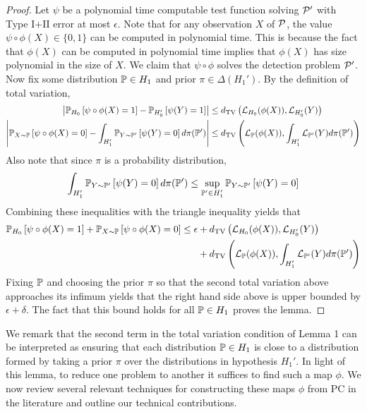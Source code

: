 \documentclass[11pt]{article}
\begin{document}
\begin{proof}
Let $\psi$ be a polynomial time computable test function solving $\mathcal{P}'$ with Type I$+$II error at most $\epsilon$. Note that for any observation $X$ of $\mathcal{P}$, the value $\psi \circ \phi(X) \in \{0, 1\}$ can be computed in polynomial time. This is because the fact that $\phi(X)$ can be computed in polynomial time implies that $\phi(X)$ has size polynomial in the size of $X$. We claim that $\psi \circ \phi$ solves the detection problem $\mathcal{P}'$. Now fix some distribution $\mathbb{P} \in H_1$ and prior $\pi \in \Delta(H_1')$. By the definition of total variation,
\begin{align*}
\left| \mathbb{P}_{H_0} \left[ \psi \circ \phi(X) = 1 \right] - \mathbb{P}_{H_0'} \left[ \psi(Y) = 1 \right] \right| &\le d_{\text{TV}}\left(\mathcal{L}_{H_0}(\phi(X)), \mathcal{L}_{H_0'}(Y)\right) \\
\left| \mathbb{P}_{X \sim \mathbb{P}} \left[ \psi \circ \phi(X) = 0 \right] - \int_{H_1'} \mathbb{P}_{Y \sim \mathbb{P}'} \left[ \psi(Y) = 0 \right] d\pi(\mathbb{P}') \right| &\le d_{\text{TV}}\left( \mathcal{L}_{\mathbb{P}}(\phi(X)), \int_{H_1'} \mathcal{L}_{\mathbb{P}'}(Y) d\pi(\mathbb{P}') \right)
\end{align*}
Also note that since $\pi$ is a probability distribution,
$$\int_{H_1'} \mathbb{P}_{Y \sim \mathbb{P}'} \left[ \psi(Y) = 0 \right] d\pi(\mathbb{P}') \le \sup_{\mathbb{P}' \in H_1'} \mathbb{P}_{Y \sim \mathbb{P}'} \left[ \psi(Y) = 0 \right]$$
Combining these inequalities with the triangle inequality yields that
\begin{align*}
\mathbb{P}_{H_0} \left[ \psi \circ \phi(X) = 1 \right] + \mathbb{P}_{X \sim \mathbb{P}} \left[ \psi \circ \phi(X) = 0 \right] \le \epsilon &+ d_{\text{TV}}\left(\mathcal{L}_{H_0}(\phi(X)), \mathcal{L}_{H_0'}(Y)\right) \\
&+ d_{\text{TV}}\left( \mathcal{L}_{\mathbb{P}}(\phi(X)), \int_{H_1'} \mathcal{L}_{\mathbb{P}'}(Y) d\pi(\mathbb{P}') \right)
\end{align*}
Fixing $\mathbb{P}$ and choosing the prior $\pi$ so that the second total variation above approaches its infimum yields that the right hand side above is upper bounded by $\epsilon + \delta$. The fact that this bound holds for all $\mathbb{P} \in H_1$ proves the lemma.
\end{proof}

We remark that the second term in the total variation condition of Lemma 1 can be interpreted as ensuring that each distribution $\mathbb{P} \in H_1$ is close to a distribution formed by taking a prior $\pi$ over the distributions in hypothesis $H_1'$. In light of this lemma, to reduce one problem to another it suffices to find such a map $\phi$. We now review several relevant techniques for constructing these maps $\phi$ from PC in the literature and outline our technical contributions.
\end{document}
